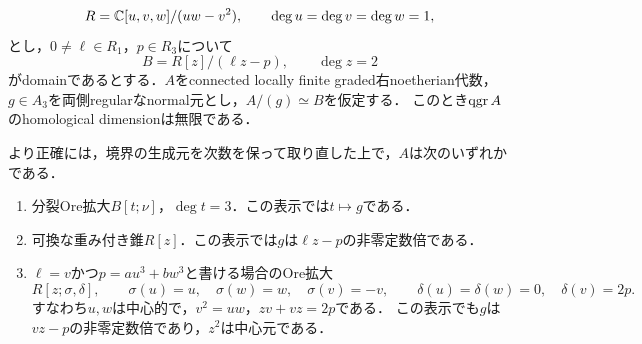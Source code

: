 \documentclass[11pt,a4paper]{ltjsarticle}
\begin{document}
\begin{theorem}[重み$(1,1,1,2)$の三次完全交叉境界のnormal被覆]
\label{thm:v6-weighted-cubic-cover}
\[
 R=\mathbb C[u,v,w]/(uw-v^2),\qquad \deg u=\deg v=\deg w=1,
\]
とし，$0\ne\ell\in R_1$，$p\in R_3$について
\[
 B=R[z]/(\ell z-p),\qquad \deg z=2
\]
がdomainであるとする．$A$をconnected locally finite graded右noetherian代数，
$g\in A_3$を両側regularなnormal元とし，$A/(g)\simeq B$を仮定する．
このとき$\operatorname{qgr} A$のhomological dimensionは無限である．

より正確には，境界の生成元を次数を保って取り直した上で，$A$は次のいずれかである．
\begin{enumerate}
\item 分裂Ore拡大$B[t;\nu]$，$\deg t=3$．この表示では$t\mapsto g$である．
\item 可換な重み付き錐$R[z]$．この表示では$g$は$\ell z-p$の非零定数倍である．
\item $\ell=v$かつ$p=a u^3+b w^3$と書ける場合のOre拡大
\[
 R[z;\sigma,\delta],\qquad
 \sigma(u)=u,\quad\sigma(w)=w,\quad\sigma(v)=-v,
 \qquad\delta(u)=\delta(w)=0,\quad\delta(v)=2p.
\]
すなわち$u,w$は中心的で，$v^2=uw$，$zv+vz=2p$である．
この表示でも$g$は$vz-p$の非零定数倍であり，$z^2$は中心元である．
\end{enumerate}
\end{theorem}
\end{document}
